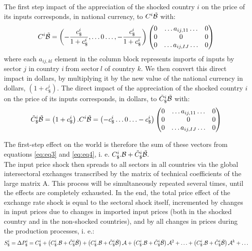 \documentclass[11pt,a4paper]{article}
\begin{document}
The first step impact of the appreciation of the shocked country $i$ on the price of its inputs corresponds, in national currency, to $C^i{\tilde{{\cal B}}}$ with: 
\begin{eqnarray}
C^i{\tilde{{\cal B}}}=\left(-\frac{c_\$^i}{1+c_\$^i},\ldots0\ldots,-\frac{c_\$^i}{1+c_\$^i} \right)\left(\begin{matrix}0&\ldots{{{a}}_{ij,11}}\ldots&0\\0&0&0\\0&\ldots{{a}_{{ij,IJ}}}\ldots&0\\\end{matrix}\right) 
\label{eq:eq4}
 \end{eqnarray}
where each ${{{a}}_{{ij,kl}}}$ element in the column block represents imports of inputs by sector $j$ in country $i~$from sector$~l$ of country $k$.
We then convert this direct impact in dollars, by multiplying it by the new value of the national currency in dollars, $\left(1+c_\$^i\right)$. The direct impact of the appreciation of the shocked country $i$ on the price of its inputs corresponds, in dollars, to ${\tilde{C}_\$^i}{\tilde{{\cal B}}}$ with: 
\begin{eqnarray}
{\tilde{C}_\$^i}{\tilde{{\cal B}}}=\left(1+c_\$^i\right).C^i{\tilde{{\cal B}}}=
\left(-c_\$^i\ldots0\ldots-c_\$^i\right)\left(\begin{matrix}0&\ldots{{{a}}_{ij,11}}\ldots&0\\0&0&0\\0&\ldots{{a}_{{ij,IJ}}}\ldots&0\\\end{matrix}\right) 
\label{eq:eq4}
 \end{eqnarray}







The first-step effect on the world is therefore the sum of these vectors from equations  \ref{eq:eq3} and \ref{eq:eq4}, i. e. $C_\$^i.{\cal B}+{\tilde{C}_\$^i}{\tilde{{\cal B}}}.~$\\
The input price shock then spreads to all sectors in all countries via the global intersectoral exchanges transcribed by the matrix of technical coefficients of the large matrix {\cal A}. This process will be simultaneously repeated several times, until the effects are completely exhausted.
In the end, the total price effect of the exchange rate shock is equal to the sectoral shock itself, incremented by changes in input prices due to changes in imported input prices (both in the shocked country and in the non-shocked countries), and by all changes in prices during the production processes, i. e.:\\
\begin{eqnarray*}
S_\$^i=\Delta{{P}_{\$}^i}=C_\$^i+ \left(C_\$^i.{\cal B}+{\tilde{C}_\$^i}{\tilde{{\cal B}}}\right)+ \left(C_\$^i.{\cal B}+{\tilde{C}_\$^i}{\tilde{{\cal B}}}\right){{\cal A}}+\left(C_\$^i.{\cal B}+{\tilde{C}_\$^i}{\tilde{{\cal B}}}\right){{\cal A}^{2}}+\ldots+\left(C_\$^i.{\cal B}+{\tilde{C}_\$^i}{\tilde{{\cal B}}}\right){\cal A}^k +\ldots \\
\end{eqnarray*}
\end{document}
